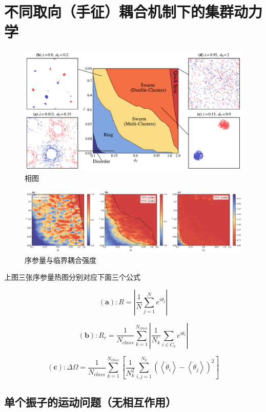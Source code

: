 \documentclass{article}
\begin{document}
\newpage
\section{不同取向（手征）耦合机制下的集群动力学}
\begin{figure}[H]
	\centering
	\includegraphics[width=\textwidth]{./figs/phaseDiagram.pdf}
	\caption{相图}
\end{figure}

\begin{figure}[H]
	\centering
	\includegraphics[width=\textwidth]{./figs/orderParam.png}
	\caption{序参量与临界耦合强度}
\end{figure}

上图三张序参量热图分别对应下面三个公式

$$
\mathbf{(a)}: R = \left| \frac{1}{N}\sum_{j=1}^N{e^{i\theta _j}} \right|
$$

$$
\mathbf{(b)}: R_c = \frac{1}{N_{class}}\sum_{k=1}^{N_{class}}{\left| \frac{1}{N_k}\sum_{i\in C_k}{e^{i\theta _i}} \right|}
$$

$$
\mathbf{(c)}: \Delta \Omega =\frac{1}{N_{class}}\sum_{k=1}^{N_{class}}{\left[ \frac{1}{N_{k}^{2}}\sum_{i,j=1}^{N_k}{\left( \left< \dot{\theta}_i \right> -\left< \dot{\theta}_j \right> \right) ^2} \right]}
$$

\newpage
\subsection{单个振子的运动问题（无相互作用）}
\end{document}
